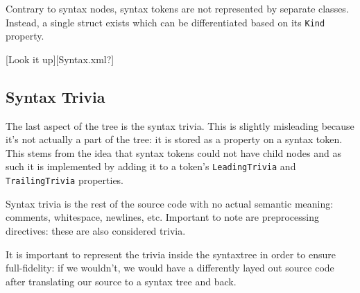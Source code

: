 Contrary to syntax nodes, syntax tokens are not represented by separate classes. Instead, a single struct exists which can be differentiated based on its \texttt{Kind} property. 

[Look it up][Syntax.xml?]

\subsection{Syntax Trivia}
\label{sec:syntax-trivia}

The last aspect of the tree is the syntax trivia. This is slightly misleading because it's not actually a part of the tree: it is stored as a property on a syntax token. This stems from the idea that syntax tokens could not have child nodes and as such it is implemented by adding it to a token's \texttt{LeadingTrivia} and \texttt{TrailingTrivia} properties. 

Syntax trivia is the rest of the source code with no actual semantic meaning: comments, whitespace, newlines, etc. Important to note are preprocessing directives: these are also considered trivia.

It is important to represent the trivia inside the \gls{syntaxtree} in order to ensure full-fidelity: if we wouldn't, we would have a differently layed out source code after translating our source to a syntax tree and back.




